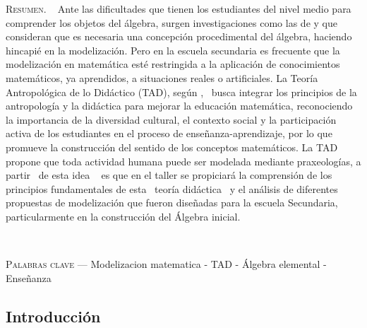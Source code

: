\begin{center}
	\begin{minipage}{0.75\linewidth} \small
		\textsc{Resumen}. ~
		Ante las dificultades que tienen los estudiantes del nivel medio para comprender los objetos del álgebra, surgen investigaciones como las de \textcite{gascon1999} y \textcite{bolea2003} que consideran que es necesaria una concepción procedimental del álgebra, haciendo hincapié en la modelización. Pero en la escuela secundaria es frecuente que la modelización en matemática esté restringida a la aplicación de conocimientos matemáticos, ya aprendidos, a situaciones reales o artificiales. La Teoría Antropológica de lo Didáctico (TAD), según \textcite{chevallard1999},  busca integrar los principios de la antropología y la didáctica para mejorar la educación matemática, reconociendo la importancia de la diversidad cultural, el contexto social y la participación activa de los estudiantes en el proceso de enseñanza-aprendizaje, por lo que promueve la construcción del sentido de los conceptos matemáticos. La TAD propone que toda actividad humana puede ser modelada mediante praxeologías, a partir  de esta idea   es que en el taller se propiciará la comprensión de los principios fundamentales de esta  teoría didáctica  y el análisis de diferentes propuestas de modelización que fueron diseñadas para la escuela Secundaria, particularmente en la construcción del Álgebra inicial.
	\end{minipage}\\
	
	\vspace{0.5em}
	
	\begin{minipage}{0.75\linewidth} \small
		\textsc{Palabras clave} --- Modelizacion matematica - TAD - Álgebra elemental - Enseñanza
	\end{minipage}
\end{center}

\subsection{Introducción}

